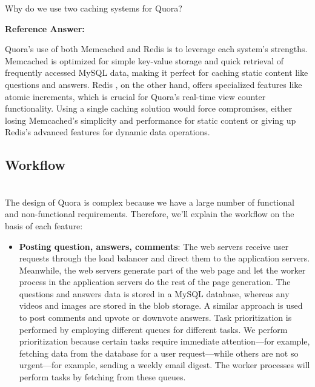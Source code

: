Why do we use two caching systems for Quora?

\textbf{Reference Answer:}

Quora's use of both Memcached and Redis is to leverage each system's strengths. Memcached is optimized for simple key-value storage and quick retrieval of frequently accessed MySQL data, making it perfect for caching static content like questions and answers. Redis , on the other hand, offers specialized features like atomic increments, which is crucial for Quora's real-time view counter functionality. Using a single caching solution would force compromises, either losing Memcached's simplicity and performance for static content or giving up Redis's advanced features for dynamic data operations.

\subsection{Workflow}\label{iszfbJb1NSBFXShMpacN-}
\\
The design of Quora is complex because we have a large number of functional and non-functional requirements. Therefore, we'll explain the workflow on the basis of each feature:

\begin{itemize}
\item
\protect{}\label{9mKsiTju3dJF8W_JYZ_Sn}
\textbf{Posting question, answers, comments}: The web servers receive user requests through the load balancer and direct them to the application servers. Meanwhile, the web servers generate part of the web page and let the worker process in the application servers do the rest of the page generation. The questions and answers data is stored in a MySQL database, whereas any videos and images are stored in the blob storage. A similar approach is used to post comments and upvote or downvote answers. Task prioritization is performed by employing different queues for different tasks. We perform prioritization because certain tasks require immediate attention---for example, fetching data from the database for a user request---while others are not so urgent---for example, sending a weekly email digest. The worker processes will perform tasks by fetching from these queues.
\end{itemize}

